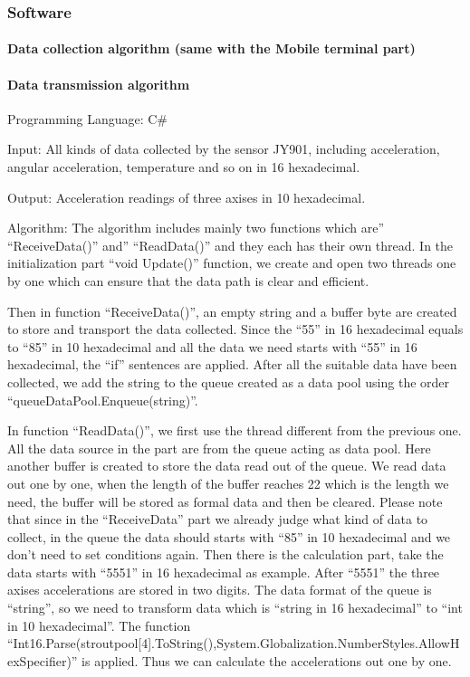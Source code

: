 \subsubsection{Software}
\paragraph{Data collection algorithm (same with the Mobile terminal part)}
\paragraph{Data transmission algorithm}

Programming Language: C\#

Input: All kinds of data collected by the sensor JY901, including acceleration,
angular acceleration, temperature and so on in 16 hexadecimal.   

Output: Acceleration readings of three axises in 10 hexadecimal. 

Algorithm: The algorithm includes mainly two functions which are''
``ReceiveData()'' and'' ``ReadData()'' and they each has their own thread. In
the initialization part “void Update()” function, we create and open two threads
one by one which can ensure that the data path is clear and efficient. 

Then in function ``ReceiveData()'', an empty string and a buffer byte are
created to store and transport the data collected. Since the “55” in 16
hexadecimal equals to “85” in 10 hexadecimal and all the data we need starts
with “55” in 16 hexadecimal, the “if” sentences are applied. After all the
suitable data have been collected, we add the string to the queue created as a
data pool using the order “queueDataPool.Enqueue(string)”. 

In function ``ReadData()'', we first use the thread different from the previous
one. All the data source in the part are from the queue acting as data pool.
Here another buffer is created to store the data read out of the queue. We read
data out one by one, when the length of the buffer reaches 22 which is the
length we need, the buffer will be stored as formal data and then be cleared.
Please note that since in the “ReceiveData” part we already judge what kind of
data to collect, in the queue the data should starts with “85” in 10 hexadecimal
and we don’t need to set conditions again. Then there is the calculation part,
take the data starts with “5551” in 16 hexadecimal as example. After “5551” the
three axises accelerations are stored in two digits. The data format of the
queue is “string”, so we need to transform data which is “string in 16
hexadecimal” to “int in 10 hexadecimal”. The function
“Int16.Parse(stroutpool[4].ToString(),System.Globalization.NumberStyles.AllowHexSpecifier)” 
is applied. Thus we can calculate the accelerations out one by one.

